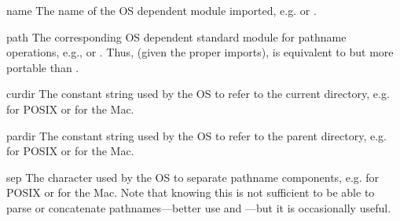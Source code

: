 \renewcommand{\indexsubitem}{(in module os)}
\begin{datadesc}{name}
The name of the OS dependent module imported, e.g.  or
.
\end{datadesc}

\begin{datadesc}{path}
The corresponding OS dependent standard module for pathname
operations, e.g.,  or .  Thus, (given
the proper imports),  is equivalent to but
more portable than .
\end{datadesc}

\begin{datadesc}{curdir}
The constant string used by the OS to refer to the current directory,
e.g.  for POSIX or  for the Mac.
\end{datadesc}

\begin{datadesc}{pardir}
The constant string used by the OS to refer to the parent directory,
e.g.  for POSIX or  for the Mac.
\end{datadesc}

\begin{datadesc}{sep}
The character used by the OS to separate pathname components, e.g.
 for POSIX or  for the Mac.  Note that knowing this
is not sufficient to be able to parse or concatenate pathnames---better
use  and ---but it is
occasionally useful.
\end{datadesc}

